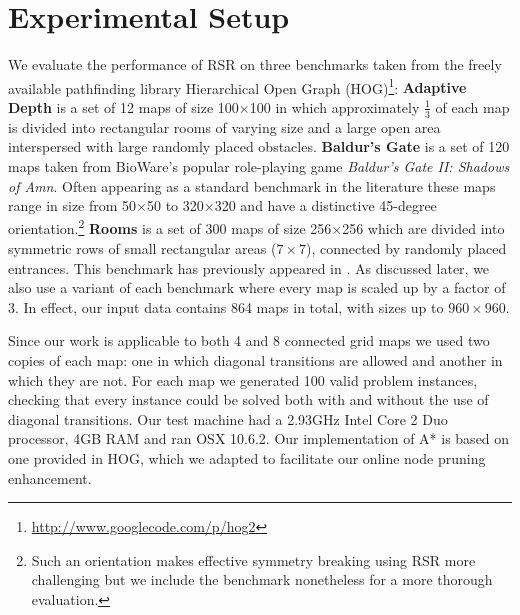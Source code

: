 \section{Experimental Setup}
\label{cha::rsr::setup}
We evaluate the performance of RSR on three benchmarks taken from the freely
available pathfinding library Hierarchical Open Graph
(HOG)\footnote{\url{http://www.googlecode.com/p/hog2}}: {\textbf{Adaptive Depth}
is a set of 12 maps of size 100$\times$100 in which approximately $\frac{1}{3}$
of each map is divided into rectangular rooms of varying size and a large
open area interspersed with large randomly placed obstacles.} {\textbf{Baldur's
Gate} is a set of 120 maps taken from BioWare's popular role-playing game
\emph{Baldur's Gate II: Shadows of Amn}.  Often appearing as a standard
benchmark in the literature \citep{bjornsson06,harabor10,pochter10} these maps
range in size from 50$\times$50 to 320$\times$320 and have a distinctive
45-degree orientation.\footnote{Such an orientation makes effective symmetry
breaking using RSR more challenging but we include the benchmark nonetheless
for a more thorough evaluation.}}
{\textbf{Rooms} is a set of 300 maps of size
256$\times$256 which are divided into symmetric rows of small rectangular areas
($7\times7$), connected by randomly placed entrances. This benchmark has
previously appeared in \citep{sturtevant09,pochter10,goldenberg10}.}
As discussed later, we also use a variant of each benchmark where every map is
scaled up by a factor of 3. In effect, our input data contains 864 maps in
total, with sizes up to $960\times960$.  
\par
Since our work is applicable to both 4 and 8 connected grid maps we used two
copies of each map: one in which diagonal transitions are allowed and another
in which they are not.  For each map we generated 100 valid problem instances,
checking that every instance could be solved both with and without the use of
diagonal transitions.  Our test machine had a 2.93GHz Intel Core 2 Duo
processor, 4GB RAM and ran OSX 10.6.2.  Our implementation of A* is based on
one provided in HOG, which we adapted to facilitate our online node pruning
enhancement.

